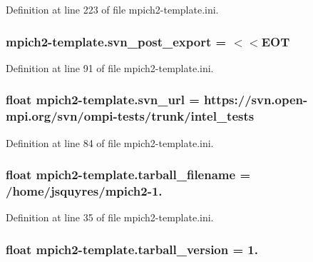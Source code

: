 Definition at line 223 of file mpich2-\/template.\-ini.

\hypertarget{namespacempich2-template_a8bdb132d6863e51986a00ebae55adabd}{
\subsubsection[{svn\-\_\-post\-\_\-export}]{\setlength{\rightskip}{0pt plus 5cm}mpich2-\/template.\-svn\-\_\-post\-\_\-export = $<$$<$E\-O\-T}}\label{namespacempich2-template_a8bdb132d6863e51986a00ebae55adabd}


Definition at line 91 of file mpich2-\/template.\-ini.

\hypertarget{namespacempich2-template_a4951a49f371e925195481dc34a166a0a}{
\subsubsection[{svn\-\_\-url}]{\setlength{\rightskip}{0pt plus 5cm}float mpich2-\/template.\-svn\-\_\-url = https\-://svn.\-open-\/mpi.\-org/svn/ompi-\/tests/trunk/intel\-\_\-tests}}\label{namespacempich2-template_a4951a49f371e925195481dc34a166a0a}


Definition at line 84 of file mpich2-\/template.\-ini.

\hypertarget{namespacempich2-template_aa946b9eaec8fb25af4f03c7271804090}{
\subsubsection[{tarball\-\_\-filename}]{\setlength{\rightskip}{0pt plus 5cm}float mpich2-\/template.\-tarball\-\_\-filename = /home/jsquyres/mpich2-\/1.}}\label{namespacempich2-template_aa946b9eaec8fb25af4f03c7271804090}


Definition at line 35 of file mpich2-\/template.\-ini.

\hypertarget{namespacempich2-template_a7ae4515fd7f67881d2edc4db6b0c4199}{
\subsubsection[{tarball\-\_\-version}]{\setlength{\rightskip}{0pt plus 5cm}float mpich2-\/template.\-tarball\-\_\-version = 1.}}\label{namespacempich2-template_a7ae4515fd7f67881d2edc4db6b0c4199}


